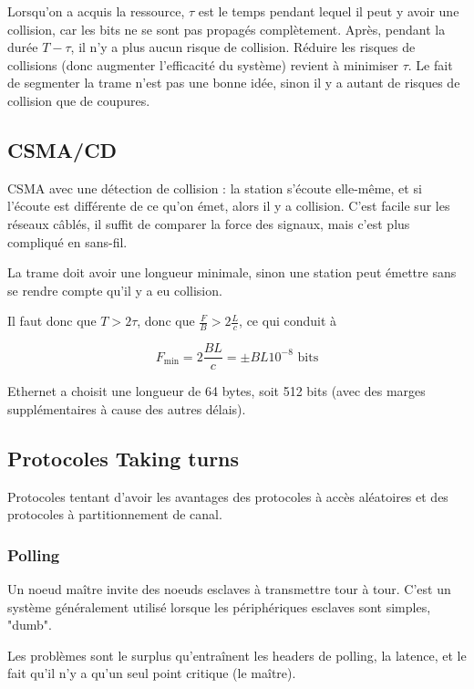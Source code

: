 	Lorsqu'on a acquis la ressource, $\tau$ est le temps pendant lequel il peut y avoir une collision, car les bits ne se sont pas propagés complètement. Après, pendant la durée $T - \tau$, il n'y a plus aucun risque de collision. Réduire les risques de collisions (donc augmenter l'efficacité du système) revient à minimiser $\tau$. Le fait de segmenter la trame n'est pas une bonne idée, sinon il y a autant de risques de collision que de coupures.
	
	\subsection{CSMA/CD}
	
	CSMA avec une détection de collision : la station s'écoute elle-même, et si l'écoute est différente de ce qu'on émet, alors il y a collision. C'est facile sur les réseaux câblés, il suffit de comparer la force des signaux, mais c'est plus compliqué en sans-fil.
	
	
	La trame doit avoir une longueur minimale, sinon une station peut émettre sans se rendre compte qu'il y a eu collision.
	
	
	Il faut donc que $T > 2\tau$, donc que $\frac{F}{B} > 2 \frac{L}{c}$, ce qui conduit à
	
	$$F_{\text{min}} = 2 \frac{BL}{c} = \pm BL 10^{-8} \text{ bits}$$
	
	Ethernet a choisit une longueur de 64 bytes, soit 512 bits (avec des marges supplémentaires à cause des autres délais).
	
	\subsection{Protocoles Taking turns}
	
	Protocoles tentant d'avoir les avantages des protocoles à accès aléatoires et des protocoles à partitionnement de canal.
	
		\subsubsection{Polling}
		
		
		
		Un noeud maître invite des noeuds esclaves à transmettre tour à tour. C'est un système généralement utilisé lorsque les périphériques esclaves sont simples, "dumb".
		
		Les problèmes sont le surplus qu'entraînent les headers de polling, la latence, et le fait qu'il n'y a qu'un seul point critique (le maître).
		

